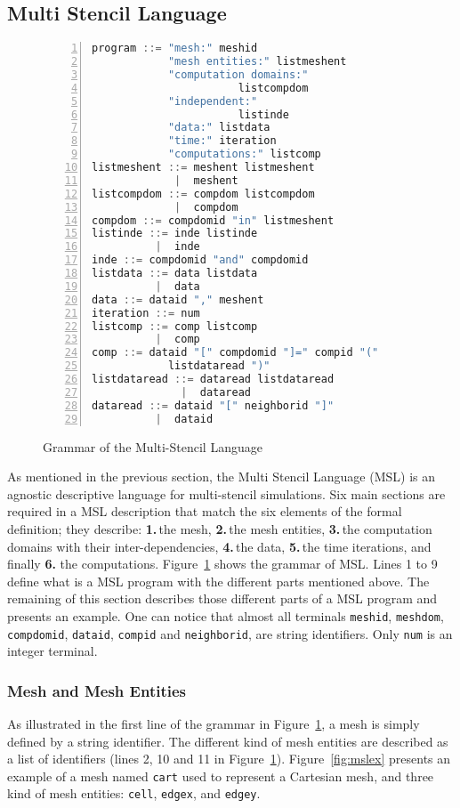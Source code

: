 \subsection{Multi Stencil Language}

\begin{figure}[t]
\begin{lstlisting}[basicstyle=\small,mathescape,frame=single,language=C++,numbers=left]
program ::= "mesh:" meshid 
            "mesh entities:" listmeshent
            "computation domains:" 
                       listcompdom
            "independent:"
                       listinde
            "data:" listdata
            "time:" iteration
            "computations:" listcomp
listmeshent ::= meshent listmeshent
             |  meshent
listcompdom ::= compdom listcompdom
             |  compdom
compdom ::= compdomid "in" listmeshent
listinde ::= inde listinde
          |  inde
inde ::= compdomid "and" compdomid
listdata ::= data listdata
          |  data
data ::= dataid "," meshent
iteration ::= num
listcomp ::= comp listcomp
          |  comp
comp ::= dataid "[" compdomid "]=" compid "(" 
            listdataread ")"
listdataread ::= dataread listdataread
              |  dataread
dataread ::= dataid "[" neighborid "]"
          |  dataid
\end{lstlisting}
\caption{Grammar of the Multi-Stencil Language}
\label{fig:grammar}
\end{figure}

As mentioned in the previous section, the Multi Stencil Language (MSL) is an agnostic descriptive language for multi-stencil simulations. Six main sections are required in a MSL description that match the six elements of the formal definition; they describe: \textbf{1.}\,the mesh, \textbf{2.}\,the mesh entities, \textbf{3.}\,the computation domains with their inter-dependencies, \textbf{4.}\,the data, \textbf{5.}\,the time iterations, and finally \textbf{6.} the computations.
Figure~\ref{fig:grammar} shows the grammar of MSL. Lines 1 to 9 define what is a MSL program with the different parts mentioned above. The remaining of this section describes those different parts of a MSL program and presents an example.
One can notice that almost all terminals \texttt{meshid}, \texttt{meshdom}, \texttt{compdomid}, \texttt{dataid}, \texttt{compid} and \texttt{neighborid}, are string identifiers. Only \texttt{num} is an integer terminal.

\subsubsection*{Mesh and Mesh Entities}
As illustrated in the first line of the grammar in Figure~\ref{fig:grammar}, a mesh is simply defined by a string identifier.
The different kind of mesh entities are described as a list of identifiers (lines 2, 10 and 11 in Figure~\ref{fig:grammar}).
Figure~\ref{fig:mslex} presents an example of a mesh named \texttt{cart} used to represent a Cartesian mesh, and three kind of mesh entities: \texttt{cell}, \texttt{edgex}, and \texttt{edgey}.

